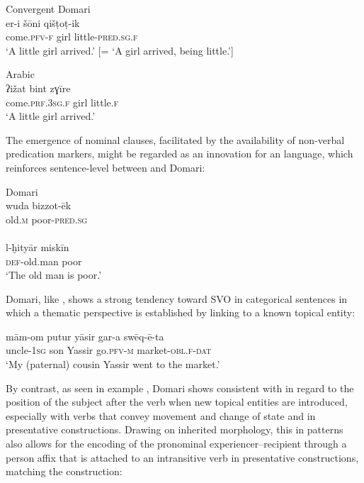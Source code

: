\documentclass[output=paper]{langsci/langscibook}
\begin{document}
\ex
{Convergent Domari}\\
\gll   er-i šōni qišṭoṭ-ik  \\
       come.\textsc{pfv-f} girl little-\textsc{pred.sg.f}\\
\glt   ‘A little girl arrived.’ [= ‘A girl arrived, being little.’] \label{girlb}

\ex
{Arabic}\\
\gll ʔižat bint zɣīre  \\
       come.\textsc{prf.3sg.f} girl little.\textsc{f}\\
\glt   ‘A little girl arrived.’ \label{girlc}
\z
\z

The emergence of nominal clauses, facilitated by the availability of non-verbal predication markers, might be regarded as an innovation for an  language, which reinforces sentence-level  between  and Domari:

\ea
\ea
{Domari}\\
\gll wuda bizzot-ēk  \\
     old.\textsc{m} poor-\textsc{pred.sg}\\
     
\\
\gll l-ḫityār miskīn  \\
     \textsc{def}{}-old.man poor\\
\glt ‘The old man is poor.’
\z
\z

Domari, like , shows a strong tendency toward SVO  in categorical sentences in which a thematic perspective is established by linking to a known topical entity:

\ea \gll mām-om putur yāsir gar-a swēq-ē-ta\\
         uncle-\textsc{1sg} son Yassir go.\textsc{pfv-m} market-\textsc{obl.f-dat}\\
\glt     ‘My (paternal) cousin Yassir went to the market.’
\z

By contrast, as seen in example , Domari shows consistent  with  in regard to the position of the subject after the verb when new topical entities are introduced, especially with verbs that convey movement and change of state and in presentative constructions. Drawing on inherited morphology, this  in  patterns also allows for the encoding of the pronominal experiencer--recipient through a person affix that is attached to an intransitive verb in presentative constructions, matching the  construction:
\end{document}
